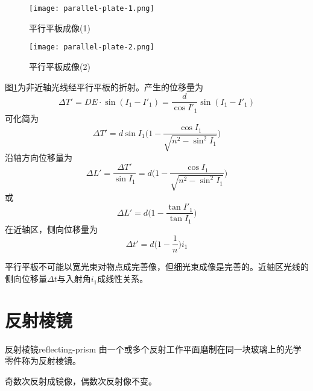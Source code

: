 \documentclass[cn,11pt]{elegantbook}
\begin{document}
\begin{figure}[htbp]
	\begin{minipage}[t]{0.48\textwidth}
		\centering
		\texttt{[image: parallel-plate-1.png]}
		\caption{平行平板成像(1)}
		\label{fig:parallel-plate-1}
	\end{minipage}
	\qquad
	\begin{minipage}[t]{0.45\textwidth}
		\centering
		\texttt{[image: parallel-plate-2.png]}
		\caption{平行平板成像(2)}
		\label{fig:parallel-plate-2}
	\end{minipage}
\end{figure}

图\ref{fig:parallel-plate-2}为非近轴光线经平行平板的折射。产生的位移量为
\begin{equation}
\Delta T'=DE\cdot\sin(I_1-I'_1)=\frac{d}{\cos{I'_1}}\sin(I_1-I'_1)
\end{equation}
可化简为
\begin{equation}
\Delta T'=d\sin I_1\bigg(1-\frac{\cos I_1}{\sqrt{n^2-\sin^2 I_1}}\bigg)
\end{equation}
沿轴方向位移量为
\begin{equation}
\Delta L'=\frac{\Delta T'}{\sin I_1}=d\bigg(1-\frac{\cos I_1}{\sqrt{n^2-\sin^2 I_1}}\bigg)
\end{equation}
或
\begin{equation}
\Delta L'=d\bigg(1-\frac{\tan I'_1}{\tan I_1}\bigg)
\end{equation}
在近轴区，侧向位移量为
\begin{equation}
\Delta t'=d\bigg(1-\frac{1}{n}\bigg)i_1
\end{equation}

\begin{note}
	平行平板不可能以宽光束对物点成完善像，但细光束成像是完善的。近轴区光线的侧向位移量$\Delta t$与入射角$i_1$成线性关系。
\end{note}

\section{反射棱镜}
\label{sect:reflecting-prism}

\begin{definition}{反射棱镜}{reflecting-prism}
	由一个或多个反射工作平面磨制在同一块玻璃上的光学零件称为反射棱镜。
\end{definition}

\begin{property}
	奇数次反射成镜像，偶数次反射像不变。
\end{property}
\end{document}

